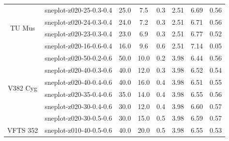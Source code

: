 \begin{table}
\begin{tabular}{c|l|c|c|c|c||c|c}
                                        \midrule
         \multirow{4}{*}{TU Mus}      & sneplot-z020-25-0.3-0.4 &          25.0          &          7.5           &   0.3   &        2.51         & 6.69                  & 0.56                     \\
                                      & sneplot-z020-24-0.3-0.4 &          24.0          &          7.2           &   0.3   &        2.51         & 6.71                  & 0.56                     \\
                                      & sneplot-z020-23-0.3-0.4 &          23.0          &          6.9           &   0.3   &        2.51         & 6.77                  & 0.52                     \\
                                      & sneplot-z020-16-0.6-0.4 &          16.0          &          9.6           &   0.6   &        2.51         & 7.14                  & 0.05                     \\
                                        \midrule
         \multirow{6}{*}{V382 Cyg}    & sneplot-z020-50-0.2-0.6 &          50.0          &          10.0          &   0.2   &        3.98         & 6.44                  & 0.56                     \\
                                      & sneplot-z020-40-0.3-0.6 &          40.0          &          12.0          &   0.3   &        3.98         & 6.52                  & 0.54                     \\
                                      & sneplot-z020-40-0.4-0.6 &          40.0          &          16.0          &   0.4   &        3.98         & 6.51                  & 0.55                     \\
                                      & sneplot-z020-35-0.4-0.6 &          35.0          &          14.0          &   0.4   &        3.98         & 6.55                  & 0.56                     \\
                                      & sneplot-z020-30-0.4-0.6 &          30.0          &          12.0          &   0.4   &        3.98         & 6.60                  & 0.57                     \\
                                      & sneplot-z020-30-0.5-0.6 &          30.0          &          15.0          &   0.5   &        3.98         & 6.59                  & 0.57                     \\
                                        \midrule
         \multirow{1}{*}{VFTS 352}    & sneplot-z010-40-0.5-0.6 &          40.0          &          20.0          &   0.5   &        3.98         & 6.55                  & 0.53                     \\


\end{tabular}
\end{table}
